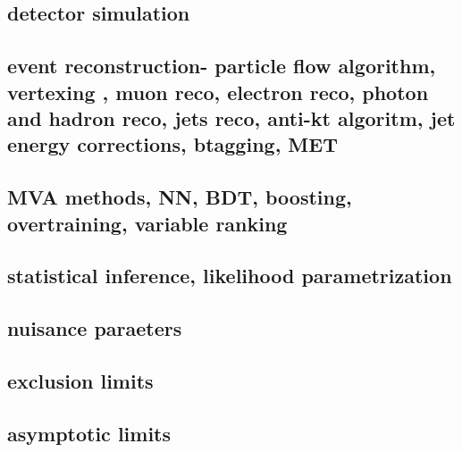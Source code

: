 \subsection{ detector simulation}
\subsection{event reconstruction- particle flow algorithm, vertexing , muon reco, electron reco, photon and hadron reco, jets reco, anti-kt algoritm, jet energy corrections, btagging, MET  }
\subsection{ MVA methods, NN, BDT, boosting, overtraining, variable ranking  }
\subsection{statistical inference, likelihood parametrization}
\subsection{ nuisance paraeters}
\subsection{exclusion limits }
\subsection{asymptotic limits }

